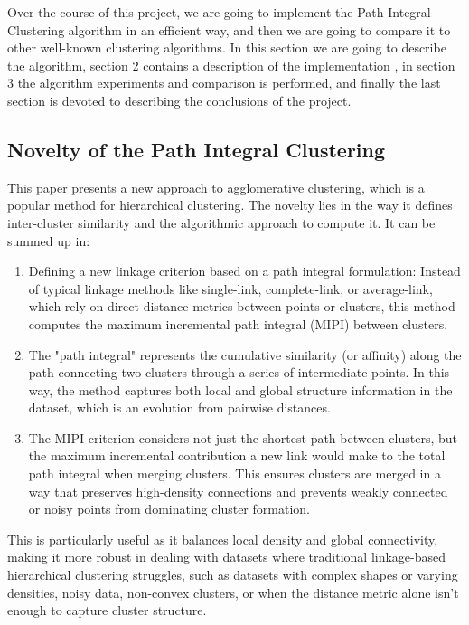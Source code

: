 \documentclass[
	10pt,
	parskip=half-,	
	paper=a4,
	english
	]{scrartcl}
\begin{document}
Over the course of this project, we are going to implement the Path Integral Clustering algorithm in an efficient way, and then we are going to compare it to other well-known clustering algorithms. In this section we are going to describe the algorithm, section 2 contains a description of the implementation , in section 3 the algorithm experiments and comparison is performed, and finally the last section is devoted to describing the conclusions of the project.

\subsection{Novelty of the Path Integral Clustering}

This paper presents a new approach to agglomerative clustering, which is a popular method for hierarchical clustering. The novelty lies in the way it defines inter-cluster similarity and the algorithmic approach to compute it. It can be summed up in:

\begin{enumerate}
    \item Defining a new linkage criterion based on a path integral formulation: Instead of typical linkage methods like single-link, complete-link, or average-link, which rely on direct distance metrics between points or clusters, this method computes the maximum incremental path integral (MIPI) between clusters.
    
    \item The "path integral" represents the cumulative similarity (or affinity) along the path connecting two clusters through a series of intermediate points. In this way, the method captures both local and global structure information in the dataset, which is an evolution from pairwise distances.
    
    \item The MIPI criterion considers not just the shortest path between clusters, but the maximum incremental contribution a new link would make to the total path integral when merging clusters. This ensures clusters are merged in a way that preserves high-density connections and prevents weakly connected or noisy points from dominating cluster formation.
\end{enumerate}

This is particularly useful as it balances local density and global connectivity, making it more robust in dealing with datasets where traditional linkage-based hierarchical clustering struggles, such as datasets with complex shapes or varying densities, noisy data, non-convex clusters, or when the distance metric alone isn't enough to capture cluster structure.
\end{document}

